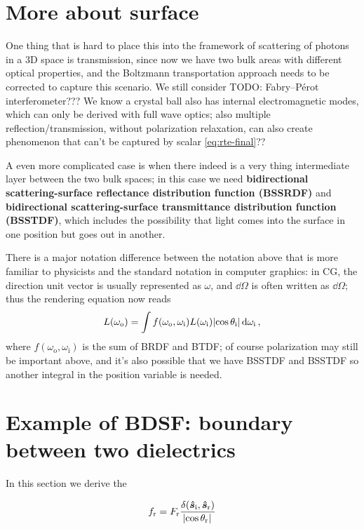 \documentclass[hyperref, a4paper]{article}
\newcommand*{\concept}[1]{{\textbf{#1}}}
\begin{document}
\section{More about surface}


One thing that is hard to place this into the framework 
of scattering of photons in a 3D space
is transmission, 
since now we have two bulk areas with different optical properties,
and the Boltzmann transportation approach needs to be corrected 
to capture this scenario.
We still consider TODO: Fabry–Pérot interferometer??? We know a crystal ball also has internal electromagnetic modes, which can only be derived with full wave optics; 
also multiple reflection/transmission, 
without polarization relaxation,
can also create phenomenon that can't be captured by scalar \eqref{eq:rte-final}??

A even more complicated case is when there indeed is 
a very thing intermediate layer between the two bulk spaces; 
in this case we need \concept{bidirectional scattering-surface reflectance distribution function (BSSRDF)}
and \concept{bidirectional scattering-surface transmittance distribution function (BSSTDF)},
which includes the possibility that light comes into the surface in one position 
but goes out in another.

There is a major notation difference between the notation above that is more familiar to physicists
and the standard notation in computer graphics:
in CG, the direction unit vector is usually represented as $\omega$, 
and $\dd{\Omega}$ is often written as $\dd{\Omega}$;
thus the rendering equation now reads 
\begin{equation}
    L(\omega_{\text{o}}) = \int f(\omega_{\text{o}}, \omega_{\text{i}}) L(\omega_{\text{i}}) \abs{\cos \theta_{\text{i}}} \dd{\omega_{\text{i}}},
\end{equation}
where $f(\omega_{\text{o}}, \omega_{\text{i}})$ 
is the sum of BRDF and BTDF; 
of course polarization may still be important above, 
and it's also possible that we have BSSTDF and BSSTDF 
so another integral in the position variable is needed.

\section{Example of BDSF: boundary between two dielectrics}

In this section we derive the 

\begin{equation}
    f_{\text{r}} = F_{\text{r}} \frac{\delta(\vu*{s}_\text{i}, \vu*{s}_{\text{r}})}{\abs*{\cos \theta_{\text{r}}}}
\end{equation}
\end{document}
